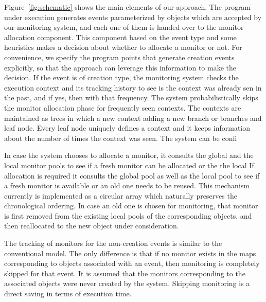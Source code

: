 Figure~\ref{fig:schematic} shows the main elements of our approach. The program 
under execution generates events parameterized by objects which are accepted by 
our monitoring system, and each one of them is handed over to the monitor 
allocation component. This component based on the event type and some heuristics 
makes a decision about whether to allocate a monitor or not. For convenience, we 
specify the program points that generate creation events explicitly, so that the 
approach can leverage this information to make the decision. If the event is of 
creation type, the monitoring system checks the execution context and its 
tracking history to see is the context was already sen in the past, and if yes, 
then with that frequency. The system probabilistically skips the monitor 
allocation phase for frequently seen contexts. The contexts are maintained as 
trees in which a new context adding a new branch or branches and leaf node. 
Every leaf node uniquely defines a context and it keeps information about the 
number 
of times the context was seen. The system can be confi

In case the system chooses to allocate a monitor, it consults the global and the 
local monitor pools to see if a fresh monitor can be allocated or the the local  
If allocation is required it consults the global pool as well as the local pool 
to see if a fresh monitor is available or an old one needs to be reused. This 
mechanism currently is implemented as a circular array which naturally preserves 
the chronological ordering. In case an old one is chosen for monitoring, that 
monitor is first removed from the existing local pools of the corresponding 
objects, and then reallocated to the new object under consideration.

The tracking of monitors for the non-creation events is similar to the 
conventional model. The only difference is that if no monitor exists in the maps 
corresponding to objects associated with an event, then monitoring is completely 
skipped for that event. It is assumed that the monitors corresponding to the 
associated objects were never created by the system. Skipping monitoring is a 
direct saving in terms of execution time.





